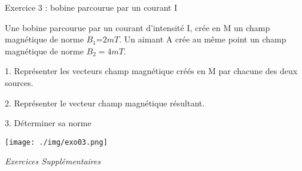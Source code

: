 \documentclass[12pt, french]{article}
\begin{document}
\begin{Box2}{Exercice 3 :  bobine parcourue par un courant I}


   Une bobine parcourue par un courant d’intensité I, crée en M un champ magnétique de norme $B_1$=$2mT$.
Un aimant A crée au même point un champ magnétique de norme $B_2=4mT$.

1. Représenter les vecteurs champ magnétique créés en M par chacune des deux sources.

2. Représenter le vecteur champ magnétique résultant.

3. Déterminer sa norme
  \begin{center}
     \texttt{[image: ./img/exo03.png]}
  \end{center}

\end{Box2}
\begin{center}

   \vspace{4cm}
   \Large{ \em{Exercices Supplémentaires}}
\end{center}
\end{document}

